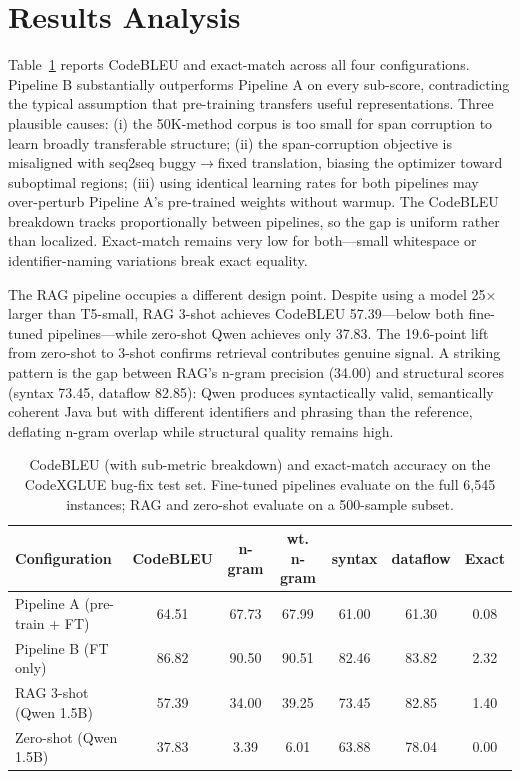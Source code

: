 \documentclass[letterpaper,12pt]{article}
\begin{document}
\vspace{-0.4cm}
\section{Results Analysis}

Table~\ref{tab:metrics} reports CodeBLEU and exact-match across all four configurations. Pipeline B substantially outperforms Pipeline A on every sub-score, contradicting the typical assumption that pre-training transfers useful representations. Three plausible causes: (i) the 50K-method corpus is too small for span corruption to learn broadly transferable structure; (ii) the span-corruption objective is misaligned with seq2seq buggy$\rightarrow$fixed translation, biasing the optimizer toward suboptimal regions; (iii) using identical learning rates for both pipelines may over-perturb Pipeline A's pre-trained weights without warmup. The CodeBLEU breakdown tracks proportionally between pipelines, so the gap is uniform rather than localized. Exact-match remains very low for both---small whitespace or identifier-naming variations break exact equality.

The RAG pipeline occupies a different design point. Despite using a model 25$\times$ larger than T5-small, RAG 3-shot achieves CodeBLEU 57.39---below both fine-tuned pipelines---while zero-shot Qwen achieves only 37.83. The 19.6-point lift from zero-shot to 3-shot confirms retrieval contributes genuine signal. A striking pattern is the gap between RAG's n-gram precision (34.00) and structural scores (syntax 73.45, dataflow 82.85): Qwen produces syntactically valid, semantically coherent Java but with different identifiers and phrasing than the reference, deflating n-gram overlap while structural quality remains high.

\vspace{-0.2cm}
\begin{table}[h!]
\centering
{
\begin{tabular}{|l|c|c|c|c|c|c|}
\hline
\textbf{Configuration} & \textbf{CodeBLEU} & \textbf{n-gram} & \textbf{wt. n-gram} & \textbf{syntax} & \textbf{dataflow} & \textbf{Exact} \\ \hline
Pipeline A (pre-train + FT)  & 64.51 & 67.73 & 67.99 & 61.00 & 61.30 & 0.08 \\
Pipeline B (FT only)         & 86.82 & 90.50 & 90.51 & 82.46 & 83.82 & 2.32 \\
RAG 3-shot (Qwen 1.5B)       & 57.39 & 34.00 & 39.25 & 73.45 & 82.85 & 1.40 \\
Zero-shot (Qwen 1.5B)        & 37.83 & 3.39  & 6.01  & 63.88 & 78.04 & 0.00 \\ \hline
\end{tabular}}
\caption{CodeBLEU (with sub-metric breakdown) and exact-match accuracy on the CodeXGLUE bug-fix test set. Fine-tuned pipelines evaluate on the full 6{,}545 instances; RAG and zero-shot evaluate on a 500-sample subset.}
\label{tab:metrics}
\end{table}
\end{document}
